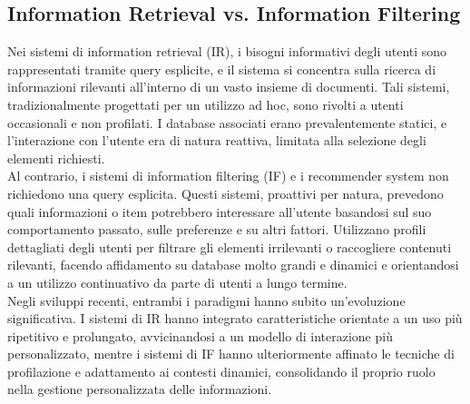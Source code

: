 \documentclass{report}
\begin{document}
	\subsection{Information Retrieval vs. Information Filtering}
	Nei sistemi di information retrieval (IR), i bisogni informativi degli utenti sono rappresentati tramite query esplicite, e il sistema si concentra sulla ricerca di informazioni rilevanti all'interno di un vasto insieme di documenti. Tali sistemi, tradizionalmente progettati per un utilizzo ad hoc, sono rivolti a utenti occasionali e non profilati. I database associati erano prevalentemente statici, e l'interazione con l'utente era di natura reattiva, limitata alla selezione degli elementi richiesti.
	\vspace{\baselineskip}\\
	Al contrario, i sistemi di information filtering (IF) e i recommender system non richiedono una query esplicita. Questi sistemi, proattivi per natura, prevedono quali informazioni o item potrebbero interessare all'utente basandosi sul suo comportamento passato, sulle preferenze e su altri fattori. Utilizzano profili dettagliati degli utenti per filtrare gli elementi irrilevanti o raccogliere contenuti rilevanti, facendo affidamento su database molto grandi e dinamici e orientandosi a un utilizzo continuativo da parte di utenti a lungo termine.
	\vspace{\baselineskip}\\
	Negli sviluppi recenti, entrambi i paradigmi hanno subito un'evoluzione significativa. I sistemi di IR hanno integrato caratteristiche orientate a un uso più ripetitivo e prolungato, avvicinandosi a un modello di interazione più personalizzato, mentre i sistemi di IF hanno ulteriormente affinato le tecniche di profilazione e adattamento ai contesti dinamici, consolidando il proprio ruolo nella gestione personalizzata delle informazioni.
\end{document}
